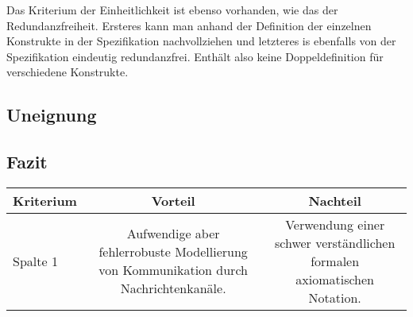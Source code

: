 Das Kriterium der Einheitlichkeit ist ebenso vorhanden, wie das der Redundanzfreiheit. Ersteres kann man anhand der Definition der einzelnen Konstrukte in der Spezifikation nachvollziehen und letzteres is ebenfalls von der Spezifikation eindeutig redundanzfrei. Enthält also keine Doppeldefinition für verschiedene Konstrukte. 




\subsection{Uneignung}
\label{scc:SDL_Uneignung}

\subsection{Fazit}
\label{scc:SDL_Fazit}

\begin{tabular}{|l|c|c|}
	\hline
	Kriterium & Vorteil & Nachteil  \\
	\hline
	Spalte 1 & Aufwendige aber fehlerrobuste Modellierung von Kommunikation durch Nachrichtenkanäle. & Verwendung einer schwer verständlichen formalen axiomatischen Notation. \\
	\hline
	\hline
\end{tabular}